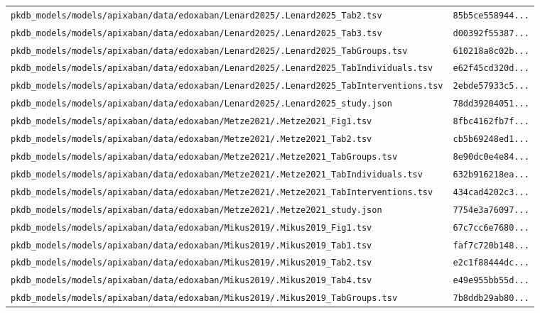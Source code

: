 \begin{longtable}{ll}
\texttt{pkdb\_models/models/apixaban/data/edoxaban/Lenard2025/.Lenard2025\_Tab2.tsv} & \texttt{85b5ce558944...} \\
\texttt{pkdb\_models/models/apixaban/data/edoxaban/Lenard2025/.Lenard2025\_Tab3.tsv} & \texttt{d00392f55387...} \\
\texttt{pkdb\_models/models/apixaban/data/edoxaban/Lenard2025/.Lenard2025\_TabGroups.tsv} & \texttt{610218a8c02b...} \\
\texttt{pkdb\_models/models/apixaban/data/edoxaban/Lenard2025/.Lenard2025\_TabIndividuals.tsv} & \texttt{e62f45cd320d...} \\
\texttt{pkdb\_models/models/apixaban/data/edoxaban/Lenard2025/.Lenard2025\_TabInterventions.tsv} & \texttt{2ebde57933c5...} \\
\texttt{pkdb\_models/models/apixaban/data/edoxaban/Lenard2025/.Lenard2025\_study.json} & \texttt{78dd39204051...} \\
\texttt{pkdb\_models/models/apixaban/data/edoxaban/Metze2021/.Metze2021\_Fig1.tsv} & \texttt{8fbc4162fb7f...} \\
\texttt{pkdb\_models/models/apixaban/data/edoxaban/Metze2021/.Metze2021\_Tab2.tsv} & \texttt{cb5b69248ed1...} \\
\texttt{pkdb\_models/models/apixaban/data/edoxaban/Metze2021/.Metze2021\_TabGroups.tsv} & \texttt{8e90dc0e4e84...} \\
\texttt{pkdb\_models/models/apixaban/data/edoxaban/Metze2021/.Metze2021\_TabIndividuals.tsv} & \texttt{632b916218ea...} \\
\texttt{pkdb\_models/models/apixaban/data/edoxaban/Metze2021/.Metze2021\_TabInterventions.tsv} & \texttt{434cad4202c3...} \\
\texttt{pkdb\_models/models/apixaban/data/edoxaban/Metze2021/.Metze2021\_study.json} & \texttt{7754e3a76097...} \\
\texttt{pkdb\_models/models/apixaban/data/edoxaban/Mikus2019/.Mikus2019\_Fig1.tsv} & \texttt{67c7cc6e7680...} \\
\texttt{pkdb\_models/models/apixaban/data/edoxaban/Mikus2019/.Mikus2019\_Tab1.tsv} & \texttt{faf7c720b148...} \\
\texttt{pkdb\_models/models/apixaban/data/edoxaban/Mikus2019/.Mikus2019\_Tab2.tsv} & \texttt{e2c1f88444dc...} \\
\texttt{pkdb\_models/models/apixaban/data/edoxaban/Mikus2019/.Mikus2019\_Tab4.tsv} & \texttt{e49e955bb55d...} \\
\texttt{pkdb\_models/models/apixaban/data/edoxaban/Mikus2019/.Mikus2019\_TabGroups.tsv} & \texttt{7b8ddb29ab80...} \\

\end{longtable}
